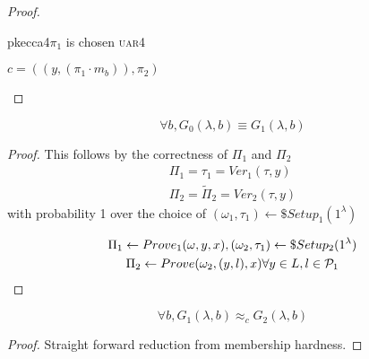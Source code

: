 \begin{proof}
\begin{cryptogame}{pkecca4}{$\pi_1$ is chosen \textsc{uar}}{4}
        \postlevel
    
        {$c = ((y, (\pi_1 \cdot m_b)), \pi_2)$}{}
    
        \postlevel
    
        \send{}{}{}
        \receive{}{}{}
    
        \postlevel
    
    
    \end{cryptogame}

\end{proof}


\begin{lemma}
    \[
        \forall b, G_{0}(\lambda, b) \equiv G_{1}(\lambda, b)   
    \]
\end{lemma}

\begin{proof}
    This follows by the correctness of $\Pi_{1}$ and $\Pi_{2}$
    \begin{gather*}
        \Pi_{1}=\tau_{1}=Ver_{1}(\tau, y)\\
         \Pi_{2}= \tilde{\Pi}_{2}=Ver_{2}(\tau, y)
    \end{gather*}
    with probability 1 over the choice of $(\omega_{1}, \tau_{1}) \leftarrow\$
    Setup_{1}(1^{\lambda})$
    
    \begin{gather*}
        \Pi_{1} \leftarrow Prove_{1}(\omega, y, x), (\omega_{2},
        \tau_{1})\leftarrow\$ Setup_{2} (1^{\lambda})\\
        \Pi_{2} \leftarrow Prove(\omega_{2}, (y, l), x) \forall y \in L , l \in
        \P_{1}
    \end{gather*}
    
\end{proof}

\begin{lemma}
    \[
        \forall b, G_{1}(\lambda, b) \approx_{c} G_{2}(\lambda, b)   
    \]
\end{lemma}
\begin{proof}
    Straight forward reduction from membership hardness.
\end{proof}

